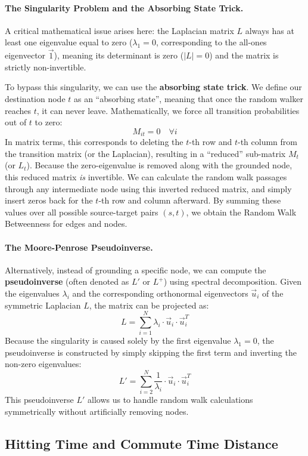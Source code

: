 \paragraph{The Singularity Problem and the Absorbing State Trick.}
A critical mathematical issue arises here: the Laplacian matrix $L$ always has at least one eigenvalue equal to zero ($\lambda_1 = 0$, corresponding to the all-ones eigenvector $\vec{1}$), meaning its determinant is zero ($|L|=0$) and the matrix is strictly non-invertible.

To bypass this singularity, we can use the \textbf{absorbing state trick}. We define our destination node $t$ as an ``absorbing state'', meaning that once the random walker reaches $t$, it can never leave. Mathematically, we force all transition probabilities out of $t$ to zero:
\[
    M_{it} = 0 \quad \forall i
\]
In matrix terms, this corresponds to deleting the $t$-th row and $t$-th column from the transition matrix (or the Laplacian), resulting in a ``reduced'' sub-matrix $M_t$ (or $L_t$). Because the zero-eigenvalue is removed along with the grounded node, this reduced matrix \textit{is} invertible. We can calculate the random walk passages through any intermediate node using this inverted reduced matrix, and simply insert zeros back for the $t$-th row and column afterward. By summing these values over all possible source-target pairs $(s, t)$, we obtain the Random Walk Betweenness for edges and nodes.

\paragraph{The Moore-Penrose Pseudoinverse.}
Alternatively, instead of grounding a specific node, we can compute the \textbf{pseudoinverse} (often denoted as $L'$ or $L^+$) using spectral decomposition. Given the eigenvalues $\lambda_i$ and the corresponding orthonormal eigenvectors $\vec{u}_i$ of the symmetric Laplacian $L$, the matrix can be projected as:
\[
    L = \sum_{i=1}^{N} \lambda_i \cdot \vec{u}_i \cdot \vec{u}_i^T
\]
Because the singularity is caused solely by the first eigenvalue $\lambda_1 = 0$, the pseudoinverse is constructed by simply skipping the first term and inverting the non-zero eigenvalues:
\[
    L' = \sum_{i=2}^{N} \frac{1}{\lambda_i} \cdot \vec{u}_i \cdot \vec{u}_i^T
\]
This pseudoinverse $L'$ allows us to handle random walk calculations symmetrically without artificially removing nodes.

\subsection{Hitting Time and Commute Time Distance}

